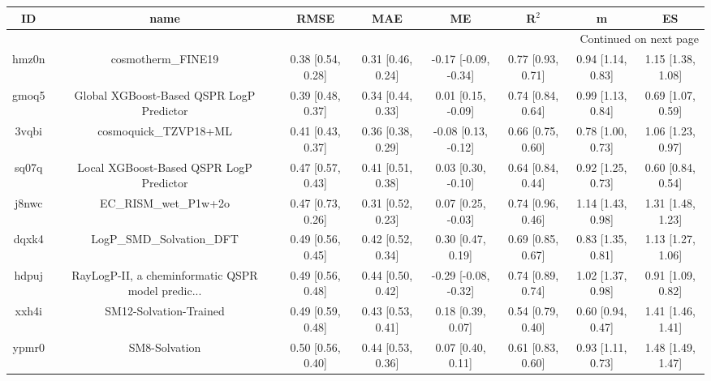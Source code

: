 \documentclass{article}
\begin{document}
\begin{center}
\begin{longtable}{|cccccccc|}
\toprule
    ID &                                               name &               RMSE &                MAE &                    ME &              R$^2$ &                     m &                    ES \\
\midrule
\endhead
\midrule
\multicolumn{8}{r}{{Continued on next page}} \\
\midrule
\endfoot

\bottomrule
\endlastfoot
 hmz0n &                                 cosmotherm\_FINE19 &  0.38 [0.54, 0.28] &  0.31 [0.46, 0.24] &  -0.17 [-0.09, -0.34] &  0.77 [0.93, 0.71] &     0.94 [1.14, 0.83] &     1.15 [1.38, 1.08] \\
 gmoq5 &           Global XGBoost-Based QSPR LogP Predictor &  0.39 [0.48, 0.37] &  0.34 [0.44, 0.33] &    0.01 [0.15, -0.09] &  0.74 [0.84, 0.64] &     0.99 [1.13, 0.84] &     0.69 [1.07, 0.59] \\
 3vqbi &                              cosmoquick\_TZVP18+ML &  0.41 [0.43, 0.37] &  0.36 [0.38, 0.29] &   -0.08 [0.13, -0.12] &  0.66 [0.75, 0.60] &     0.78 [1.00, 0.73] &     1.06 [1.23, 0.97] \\
 sq07q &            Local XGBoost-Based QSPR LogP Predictor &  0.47 [0.57, 0.43] &  0.41 [0.51, 0.38] &    0.03 [0.30, -0.10] &  0.64 [0.84, 0.44] &     0.92 [1.25, 0.73] &     0.60 [0.84, 0.54] \\
 j8nwc &                              EC\_RISM\_wet\_P1w+2o &  0.47 [0.73, 0.26] &  0.31 [0.52, 0.23] &    0.07 [0.25, -0.03] &  0.74 [0.96, 0.46] &     1.14 [1.43, 0.98] &     1.31 [1.48, 1.23] \\
 dqxk4 &                          LogP\_SMD\_Solvation\_DFT &  0.49 [0.56, 0.45] &  0.42 [0.52, 0.34] &     0.30 [0.47, 0.19] &  0.69 [0.85, 0.67] &     0.83 [1.35, 0.81] &     1.13 [1.27, 1.06] \\
 hdpuj &  RayLogP-II, a cheminformatic QSPR model predic... &  0.49 [0.56, 0.48] &  0.44 [0.50, 0.42] &  -0.29 [-0.08, -0.32] &  0.74 [0.89, 0.74] &     1.02 [1.37, 0.98] &     0.91 [1.09, 0.82] \\
 xxh4i &                             SM12-Solvation-Trained &  0.49 [0.59, 0.48] &  0.43 [0.53, 0.41] &     0.18 [0.39, 0.07] &  0.54 [0.79, 0.40] &     0.60 [0.94, 0.47] &     1.41 [1.46, 1.41] \\
 ypmr0 &                                      SM8-Solvation &  0.50 [0.56, 0.40] &  0.44 [0.53, 0.36] &     0.07 [0.40, 0.11] &  0.61 [0.83, 0.60] &     0.93 [1.11, 0.73] &     1.48 [1.49, 1.47] \\

\end{longtable}
\end{center}
\end{document}
